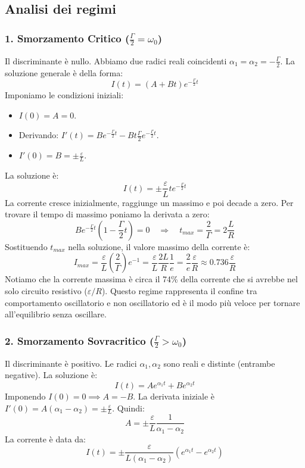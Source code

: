 \documentclass{book}
\begin{document}
\subsection{Analisi dei regimi}

\subsubsection{1. Smorzamento Critico ($\frac{\Gamma}{2} = \omega_0$)}
Il discriminante è nullo. Abbiamo due radici reali coincidenti $\alpha_1 = \alpha_2 = -\frac{\Gamma}{2}$.
La soluzione generale è della forma:
$$
I(t) = (A + Bt) e^{-\frac{\Gamma}{2}t}
$$
Imponiamo le condizioni iniziali:
\begin{itemize}
    \item $I(0) = A = 0$.
    \item Derivando: $I'(t) = B e^{-\frac{\Gamma}{2}t} - B t \frac{\Gamma}{2} e^{-\frac{\Gamma}{2}t}$.
    \item $I'(0) = B = \pm \frac{\varepsilon}{L}$.
\end{itemize}
La soluzione è:
$$
I(t) = \pm \frac{\varepsilon}{L} t e^{-\frac{\Gamma}{2}t}
$$
La corrente cresce inizialmente, raggiunge un massimo e poi decade a zero. Per trovare il tempo di massimo poniamo la derivata a zero:
$$
B e^{-\frac{\Gamma}{2}t} \left(1 - \frac{\Gamma}{2}t\right) = 0 \quad \Rightarrow \quad t_{max} = \frac{2}{\Gamma} = 2 \frac{L}{R}
$$
Sostituendo $t_{max}$ nella soluzione, il valore massimo della corrente è:
$$
I_{max} = \frac{\varepsilon}{L} \left(\frac{2}{\Gamma}\right) e^{-1} = \frac{\varepsilon}{L} \frac{2L}{R} \frac{1}{e} = \frac{2}{e} \frac{\varepsilon}{R} \approx 0.736 \frac{\varepsilon}{R}
$$
Notiamo che la corrente massima è circa il 74\% della corrente che si avrebbe nel solo circuito resistivo ($\varepsilon/R$). Questo regime rappresenta il confine tra comportamento oscillatorio e non oscillatorio ed è il modo più veloce per tornare all'equilibrio senza oscillare.

\subsubsection{2. Smorzamento Sovracritico ($\frac{\Gamma}{2} > \omega_0$)}
Il discriminante è positivo. Le radici $\alpha_1, \alpha_2$ sono reali e distinte (entrambe negative).
La soluzione è:
$$
I(t) = A e^{\alpha_1 t} + B e^{\alpha_2 t}
$$
Imponendo $I(0)=0 \implies A = -B$.
La derivata iniziale è $I'(0) = A(\alpha_1 - \alpha_2) = \pm \frac{\varepsilon}{L}$. Quindi:
$$
A = \pm \frac{\varepsilon}{L} \frac{1}{\alpha_1 - \alpha_2}
$$
La corrente è data da:
$$
I(t) = \pm \frac{\varepsilon}{L (\alpha_1 - \alpha_2)} \left( e^{\alpha_1 t} - e^{\alpha_2 t} \right)
$$
\end{document}
